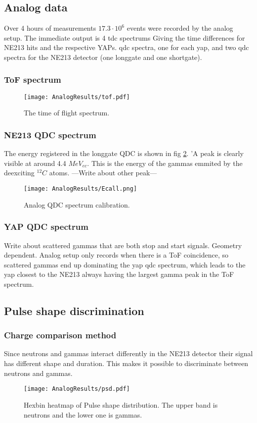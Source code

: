 \documentclass[main.tex]{subfiles}
\begin{document}
\subsection{Analog data}
Over 4 hours of measurements $17.3\cdot 10^{6}$ events were recorded by the analog setup. The immediate output is 4 tdc spectrums Giving the time differences for NE213 hits and the respective YAPs. qdc spectra, one for each yap, and two qdc spectra for the NE213 detector (one longgate and one shortgate).

\newpage
\subsubsection{ToF spectrum}
\begin{figure}[ht]
    \centering
        \texttt{[image: AnalogResults/tof.pdf]}
        \caption{The time of flight spectrum.}
    \label{fig:A_TOF}
\end{figure}

\newpage

\subsubsection{NE213 QDC spectrum}
The energy registered in the longgate QDC is shown in fig \ref{fig:qdc_a}. 'A peak is clearly visible at around 4.4 $MeV_{ec}$. This is the energy of the gammas emmited by the deexciting $^{12}C$ atoms. ---Write about other peak---
\begin{figure}[ht!]
    \centering
        \texttt{[image: AnalogResults/Ecall.png]}
        \caption{Analog QDC spectrum calibration.}
    \label{fig:qdc_a}
\end{figure}

\newpage
\subsubsection{YAP QDC spectrum}
Write about scattered gammas that are both stop and start signals. Geometry dependent. Analog setup only records when there is a ToF coincidence, so scattered gammas end up dominating the yap qdc spectrum, which leads to the yap closest to the NE213 always having the largest gamma peak in the ToF spectrum. 

\newpage
\subsection{Pulse shape discrimination}
\subsubsection{Charge comparison method}
Since neutrons and gammas interact differently in the NE213 detector their signal has different shape and duration. This makes it possible to discriminate between neutrons and gammas.
\begin{figure}
    \centering
        \texttt{[image: AnalogResults/psd.pdf]}
        \caption{Hexbin heatmap of Pulse shape distribution. The upper band is neutrons and the lower one is gammas.}
        \label{fig:hex_a}
\end{figure}
\end{document}
